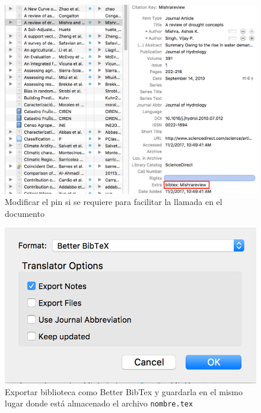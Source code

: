 \documentclass[11pt,]{article}
\begin{document}
\begin{figure}[!h]
\begin{center}
\includegraphics[width=\textwidth]{Figuras/zotero_pin2.png}
\caption{Modificar el pin si se requiere para facilitar la llamada en el documento}
\label{etiqueta_figura4}
\end{center}
\end{figure}

\begin{figure}[!h]
\begin{center}
\includegraphics[width=\textwidth]{Figuras/better.png}
\caption{Exportar biblioteca como Better BibTex y guardarla en el mismo lugar donde está almacenado el archivo \texttt{nombre.tex}}
\label{etiqueta_figura5}
\end{center}
\end{figure}
\end{document}

